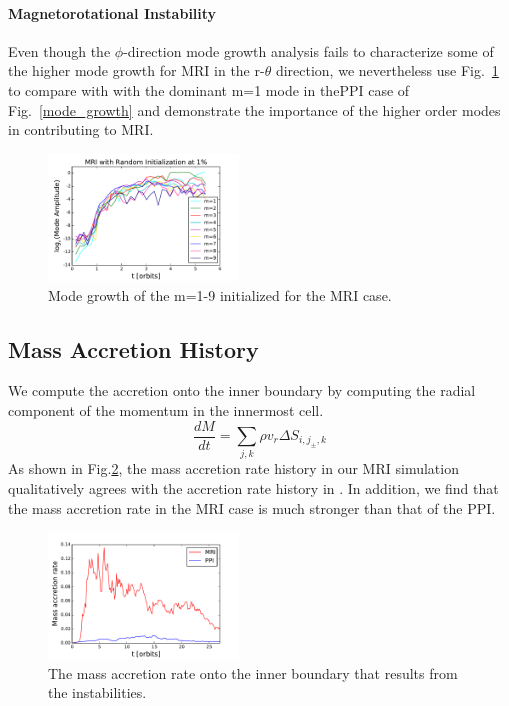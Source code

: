 \documentclass[iop,revtex4]{emulateapj}
\begin{document}
\paragraph*{\rm{\textbf{Magnetorotational Instability}\\}}
Even though the $\phi$-direction mode growth analysis fails to characterize some of the higher mode growth for \ac{MRI} in the r-$\theta$ direction, we nevertheless use Fig.~\ref{mode_growth_mri} to compare with with the dominant m=1 mode in the\ac{PPI} case of  Fig.~\ref{mode_growth} and demonstrate the importance of the higher order modes in contributing to \ac{MRI}. 

\begin{figure}[ht]
\includegraphics[width=0.45\textwidth]{plots/mri_randinit1percent_all_m.pdf}
\caption{Mode growth of the m=1-9 initialized for the \ac{MRI} case.}
\label{mode_growth_mri}
\end{figure}
\subsection{Mass Accretion History}
We compute the accretion onto the inner boundary by computing the radial component of the momentum in the innermost cell.
\begin{equation}
\frac{dM}{dt}=\sum_{j,k} \rho v_r \Delta S_{i,j_{\pm},k}
\end{equation}
As shown in Fig.\ref{mass_accretion}, the mass accretion rate history in our \ac{MRI} simulation qualitatively agrees with the accretion rate history in \cite{Jiang:2014A}. In addition, we find that the mass accretion rate in the \ac{MRI} case is much stronger than that of the \ac{PPI}.
\begin{figure}[h]
\includegraphics[width=0.45\textwidth]{plots/mass_accretion.pdf}
\caption{The mass accretion rate onto the inner boundary that results from the instabilities.}
\label{mass_accretion}
\end{figure}
\end{document}
